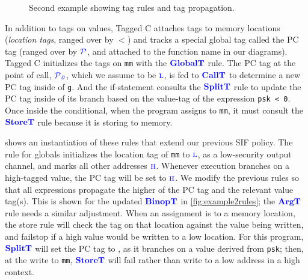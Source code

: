 \documentclass{llncs}
\begin{document}
\begin{figure}[t]
\caption{Second example showing tag rules and tag propagation.}
\label{fig:ex2}
\end{figure}

In addition to tags on values, Tagged C attaches tags to memory locations ({\em location tags}, ranged over by
\(\lt\)) and tracks a special global tag called the PC tag (ranged over by \(\PCT\), and attached to the
function name in our diagrams).
Tagged C initializes the tags on {\tt mm} with the \(\globaltname\) rule. The PC tag
at the point of call, \(\PCT[_0]\), which we assume to be \(\low\), is fed to \(\calltname\)
to determine a new PC tag
inside of {\tt g}.
And the if-statement consults the \(\splittname\) rule to update the PC tag
inside of its branch based on the value-tag of the expression {\tt psk < 0}. Once inside the
conditional, when the program assigns to {\tt mm}, it must consult the \(\storetname\) rule because
it is storing to memory.%

 shows an instantiation of these rules that extend our previous SIF policy.
The rule for globals initializes the location tag of {\tt mm} to \(\low\),
as a low-security output channel, and marks all other addresses \(\high\).
Whenever execution branches on
a high-tagged value, the PC tag will be set to \(\high\). We modify the previous rules so that
all expressions propagate the higher of the PC tag and the relevant value tag(s). This is shown
for the updated \(\binoptname\) in \cref{fig:example2rules}; the \(\argtname\) rule needs a similar
adjustment.
When an assignment is to a memory location, the store rule will check the tag on
that location against the value being written, 
and failstop if a high value would be written to a low location.
For this program, \(\splittname\) will set the PC tag to \high, as it branches on a value derived
from {\tt psk}; 
then, at the write to {\tt mm}, \(\storetname\) will fail rather than write to a low address
in a high context.
\end{document}
